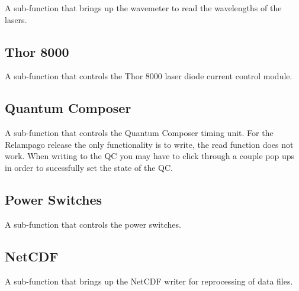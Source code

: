 A sub-function that brings up the wavemeter to read the wavelengths of the lasers. 

\subsection{Thor 8000}\label{Sec:T8000SubFunction}

A sub-function that controls the Thor 8000 laser diode current control module. 

\subsection{Quantum Composer}\label{Sec:QCSubFunction}

A sub-function that controls the Quantum Composer timing unit. For the Relampago release the only functionality is to write, the read function does not work. When writing to the QC you may have to click through a couple pop ups in order to sucessfully set the state of the QC. 

\subsection{Power Switches}\label{Sec:PowSwitchSubFunction}

A sub-function that controls the power switches.

\subsection{NetCDF}\label{Sec:NetCDFSubFunction}

A sub-function that brings up the NetCDF writer for reprocessing of data files.





\newpage 
